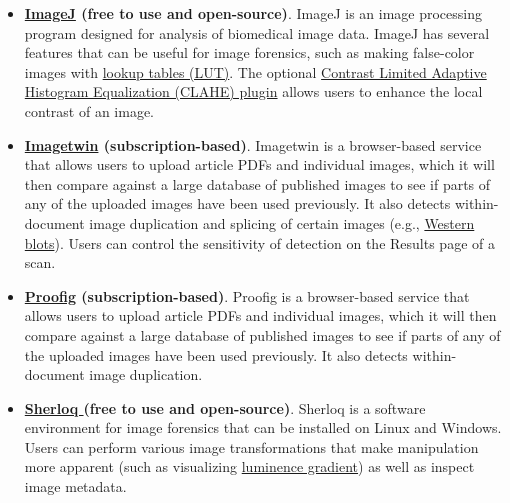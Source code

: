 \documentclass[letterpaper, 12pt]{article}
\begin{document}
\begin{itemize}
    \item \textbf{\href{https://imagej.net/ij/}{ImageJ} (free to use and open-source)}. ImageJ is an image processing program designed for analysis of biomedical image data. ImageJ has several features that can be useful for image forensics, such as making false-color images with \href{https://imagej.net/ij/docs/concepts.html}{lookup tables (LUT)}. The optional \href{https://imagej.net/ij/plugins/clahe/index.html}{Contrast Limited Adaptive Histogram Equalization (CLAHE) plugin} allows users to enhance the local contrast of an image.
    \item \textbf{\href{https://imagetwin.ai/}{Imagetwin} (subscription-based)}. Imagetwin is a browser-based service that allows users to upload article PDFs and individual images, which it will then compare against a large database of published images to see if parts of any of the uploaded images have been used previously. It also detects within-document image duplication and splicing of certain images (e.g., \href{https://en.wikipedia.org/wiki/Western_blot}{Western blots}). Users can control the sensitivity of detection on the Results page of a scan.
    \item \textbf{\href{https://www.proofig.com/}{Proofig} (subscription-based)}. Proofig is a browser-based service that allows users to upload article PDFs and individual images, which it will then compare against a large database of published images to see if parts of any of the uploaded images have been used previously. It also detects within-document image duplication.
    \item \textbf{\href{https://github.com/GuidoBartoli/sherloq}{Sherloq } (free to use and open-source)}. Sherloq is a software environment for image forensics that can be installed on Linux and Windows. Users can perform various image transformations that make manipulation more apparent (such as visualizing \href{https://en.wikipedia.org/wiki/Image_gradient}{luminence gradient}) as well as inspect image metadata.
\end{itemize}
\end{document}
